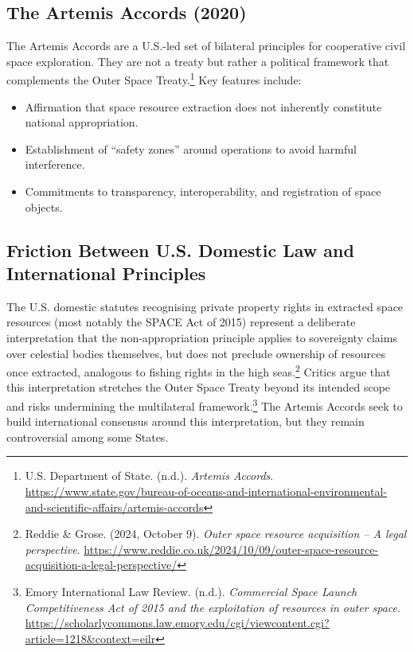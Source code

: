\subsection{The Artemis Accords (2020)}

The Artemis Accords are a U.S.-led set of bilateral principles for cooperative civil space exploration. They are not a treaty but rather a political framework that complements the Outer Space Treaty.\footnote{U.S. Department of State. (n.d.). \emph{Artemis Accords}. \url{https://www.state.gov/bureau-of-oceans-and-international-environmental-and-scientific-affairs/artemis-accords}} Key features include:

\begin{itemize}
  \item Affirmation that space resource extraction does not inherently constitute national appropriation.
  \item Establishment of “safety zones” around operations to avoid harmful interference.
  \item Commitments to transparency, interoperability, and registration of space objects.
\end{itemize}

\subsection{Friction Between U.S. Domestic Law and International Principles}

The U.S. domestic statutes recognising private property rights in extracted space resources (most notably the SPACE Act of 2015) represent a deliberate interpretation that the non-appropriation principle applies to sovereignty claims over celestial bodies themselves, but does not preclude ownership of resources once extracted, analogous to fishing rights in the high seas.\footnote{Reddie \& Grose. (2024, October 9). \emph{Outer space resource acquisition – A legal perspective}. \url{https://www.reddie.co.uk/2024/10/09/outer-space-resource-acquisition-a-legal-perspective/}} Critics argue that this interpretation stretches the Outer Space Treaty beyond its intended scope and risks undermining the multilateral framework.\footnote{Emory International Law Review. (n.d.). \emph{Commercial Space Launch Competitiveness Act of 2015 and the exploitation of resources in outer space}. \url{https://scholarlycommons.law.emory.edu/cgi/viewcontent.cgi?article=1218&context=eilr}} The Artemis Accords seek to build international consensus around this interpretation, but they remain controversial among some States.
